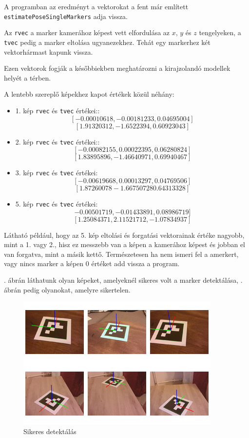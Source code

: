 A programban az eredményt a vektorokat a fent már említett \texttt{estimatePoseSingleMarkers} adja vissza.

Az \texttt{rvec} a marker kamerához képest vett elfordulása az $x$, $y$ és $z$ tengelyeken, a \texttt{tvec} pedig a marker eltolása ugyanezekhez. Tehát egy markerhez két vektorhármast kapunk vissza.

Ezen vektorok fogják a későbbiekben meghatározni a kirajzolandó modellek helyét a térben.

A lentebb szereplő képekhez kapot értékek közül néhány:
\begin{itemize}
\item 1. kép \texttt{rvec} és \texttt{tvec} értékei::
\[[-0.00010618, -0.00181233, 0.04695004]\]
\[[ 1.91320312, -1.6522394,  0.60923043]\]
\item 2. kép \texttt{rvec} és \texttt{tvec} értékei::
\[[-0.00082155,  0.00022395,  0.06280824]\]
\[[ 1.83895896, -1.46640971,  0.69940467]\]
\item 3. kép \texttt{rvec} és \texttt{tvec} értékei:
\[[-0.00619668, 0.00013297,  0.04769506]\]
\[[ 1.87260078 -1.66750728  0.64313328]\]
\item 5. kép \texttt{rvec} és \texttt{tvec} értékei:
\[-0.00501719, -0.01433891,  0.08986719]\]
\[[ 1.25084371,  2.11521712, -1.07834937]\]
\end{itemize}

Látható például, hogy az 5. kép eltolási és forgatási vektorainak értéke nagyobb, mint a 1. vagy 2., hisz ez messzebb van a képen a kamerához képest és jobban el van forgatva, mint a másik kettő.
Természetesen ha nem ismeri fel a amerkert, vagy nincs marker a képen 0 értéket add vissza a program.

. ábrán láthatunk olyan képeket, amelyeknél sikeres volt a marker detektálása, . ábrán pedig olyanokat, amelyre sikertelen.

\begin{figure}[htp]
    \centering
   	\includegraphics[width=\textwidth]{images/detect.jpg}
	\caption{Sikeres detektálás}
	\label{fig:detect}
\end{figure}

